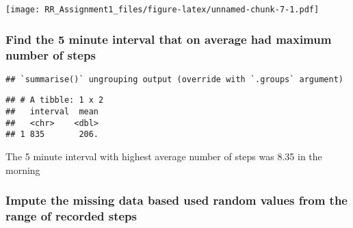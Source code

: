 \documentclass[]{article}
\newenvironment{Shaded}{\begin{snugshade}}{\end{snugshade}}
\newcommand{\DataTypeTok}[1]{\textcolor[rgb]{0.13,0.29,0.53}{#1}}
\newcommand{\DecValTok}[1]{\textcolor[rgb]{0.00,0.00,0.81}{#1}}
\newcommand{\KeywordTok}[1]{\textcolor[rgb]{0.13,0.29,0.53}{\textbf{#1}}}
\newcommand{\NormalTok}[1]{#1}
\newcommand{\OperatorTok}[1]{\textcolor[rgb]{0.81,0.36,0.00}{\textbf{#1}}}
\newcommand{\StringTok}[1]{\textcolor[rgb]{0.31,0.60,0.02}{#1}}
\begin{document}
\texttt{[image: RR\_Assignment1\_files/figure-latex/unnamed-chunk-7-1.pdf]}

\hypertarget{find-the-5-minute-interval-that-on-average-had-maximum-number-of-steps}{%
\subsubsection{Find the 5 minute interval that on average had maximum
number of
steps}\label{find-the-5-minute-interval-that-on-average-had-maximum-number-of-steps}}

\begin{Shaded}
\end{Shaded}

\begin{verbatim}
## `summarise()` ungrouping output (override with `.groups` argument)
\end{verbatim}

\begin{verbatim}
## # A tibble: 1 x 2
##   interval  mean
##   <chr>    <dbl>
## 1 835       206.
\end{verbatim}

The 5 minute interval with highest average number of steps was 8.35 in
the morning

\hypertarget{impute-the-missing-data-based-used-random-values-from-the-range-of-recorded-steps}{%
\subsubsection{Impute the missing data based used random values from the
range of recorded
steps}\label{impute-the-missing-data-based-used-random-values-from-the-range-of-recorded-steps}}

\begin{Shaded}
\end{Shaded}
\end{document}
